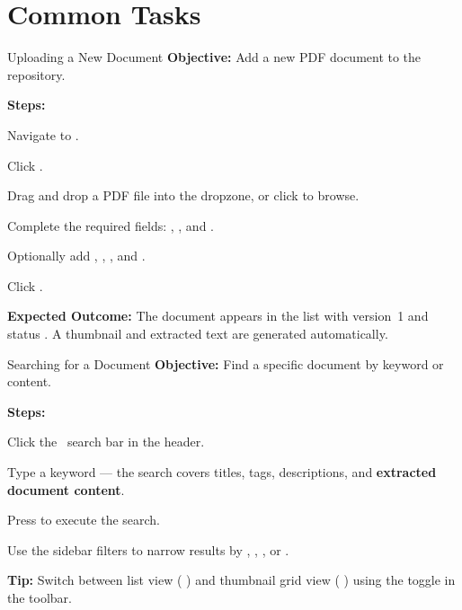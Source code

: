 \section{Common Tasks}

\begin{ugTask}{Uploading a New Document}
  \textbf{Objective:} Add a new PDF document to the repository.

  \textbf{Steps:}
  \begin{ugSteps}
    \item Navigate to .
    \item Click .
    \item Drag and drop a PDF file into the dropzone, or click
          to browse.
    \item Complete the required fields: ,
          , and .
    \item Optionally add , ,
          , and .
    \item Click .
  \end{ugSteps}

  \textbf{Expected Outcome:} The document appears in the list
  with version~1 and status .
  A thumbnail and extracted text are generated automatically.
\end{ugTask}

\vspace{8pt}

\begin{ugTask}{Searching for a Document}
  \textbf{Objective:} Find a specific document by keyword or
  content.

  \textbf{Steps:}
  \begin{ugSteps}
    \item Click the \faSearch\ search bar in the header.
    \item Type a keyword --- the search covers titles, tags,
          descriptions, and \textbf{extracted document content}.
    \item Press  to execute the search.
    \item Use the sidebar filters to narrow results by
          , ,
          , or .
  \end{ugSteps}

  \textbf{Tip:} Switch between list view (\,\faList\,) and
  thumbnail grid view (\,\faTh\,) using the toggle in the
  toolbar.
\end{ugTask}

